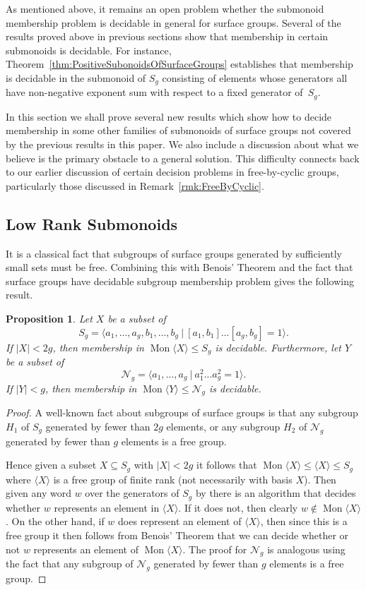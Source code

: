 \documentclass[11pt]{amsart}
\newcommand{\Mgen}[1]{\operatorname{Mon}\bigl\langle #1 \bigr\rangle}
\newcommand{\Ggen}[1]{\bigl\langle #1 \bigr\rangle}
\newcommand{\Gpres}[2]{\bigl\langle #1\:|\:#2 \bigr\rangle}
\theoremstyle{plain}
\newtheorem{prop}[theorem]{Proposition}
\theoremstyle{definition}
\begin{document}
As mentioned above, it remains an open problem whether the submonoid membership problem is decidable in general for surface groups. 
Several of the results proved above in previous sections
show that membership in certain submonoids is decidable. For instance, Theorem~\ref{thm:PositiveSubonoidsOfSurfaceGroups} establishes that membership is decidable in the submonoid of $S_g$ consisting of elements whose generators all have non-negative exponent sum with respect to a fixed generator of~$S_g$.


In this section we shall prove several new results which show how to decide membership in some other families of submonoids of surface groups not covered by the previous results in this paper.   
We also include a discussion about what we believe is the primary obstacle to a general solution. This difficulty connects back to our earlier discussion of certain decision problems in free-by-cyclic groups, particularly those discussed in Remark~\ref{rmk:FreeByCyclic}.

\subsection{Low Rank Submonoids}
It is a classical fact that subgroups of surface groups generated by sufficiently small sets must be free. 
Combining this with Benois' Theorem and the fact that surface groups have decidable subgroup membership problem gives the following result.
\begin{prop}\label{prop:LowRank} 
Let $X$ be a subset of  
\[
S_g = \Gpres{a_1, \ldots, a_g, b_1, \ldots, b_g}{[a_1,b_1]\ldots[a_g,b_g]= 1}.
\]
If $|X| < 2g$, then membership in $\Mgen{X} \leq S_g$ is decidable. Furthermore, let $Y$ be a subset of  
\[
\mathcal{N}_g = \Gpres{a_1, \ldots, a_g}{a_1^2 \ldots a_g^2= 1}.
\]
If $|Y| < g$, then membership in $\Mgen{Y} \leq \mathcal{N}_g$ is decidable.       
\end{prop}

\begin{proof}
A well-known fact about subgroups of surface groups is that any subgroup $H_1$ of $S_g$ generated by fewer than $2g$ elements, or any subgroup $H_2$ of $\mathcal{N}_g$ generated by fewer than $g$ elements is a free group.


Hence given a subset $X \subseteq S_g$ with $|X| < 2g$ it follows that $\Mgen{X} \leq \Ggen{X} \leq S_g$ where $\Ggen{X}$ is a free group of finite rank (not necessarily with basis $X$).     
Then given any word $w$ over the generators of $S_g$ by  
\cite{scott1978subgroups} there is an algorithm that decides whether $w$ represents an element in  
$\Ggen{X}$. If it does not, then clearly $w \not\in \Mgen{X}$. On the other hand, if $w$ does represent an element of $\Ggen{X}$, then since this is a free group it then follows from    
Benois' Theorem that we can decide whether or not $w$ represents an element of $\Mgen{X}$.  
The proof for $\mathcal{N}_g$ is analogous using the fact that any subgroup of 
$\mathcal{N}_g$ generated by fewer than $g$ elements is a free group.
\end{proof}
\end{document}
